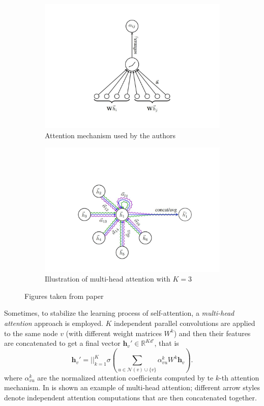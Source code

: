 \documentclass[12pt,a4paper]{report}
\theoremstyle{definition}
\begin{document}
\begin{figure}
\centering
\begin{subfigure}{.4\textwidth}
  \centering
  \includegraphics[trim={8cm 2.2cm 8cm 0}, clip,width=0.9\linewidth]{Images/GAT_article.pdf}
  \caption{Attention mechanism used by the authors}
  \label{fig:GAT_article}
\end{subfigure}
\begin{subfigure}{.58\textwidth}
  \centering
  \includegraphics[trim={5cm 2.2cm 4.5cm 0}, clip,width=0.9\linewidth]{Images/GAT_multi_head.pdf}
  \caption{Illustration of multi-head attention with $K = 3$}
  \label{fig:GAT_multihead}
\end{subfigure}
\caption{Figures taken from paper \cite{GATs}}
\label{fig:GATs}
\end{figure}

Sometimes, to stabilize the learning process of self-attention, a \emph{multi-head attention} approach is employed.
$K$ independent parallel convolutions are applied to the same node $v$ (with different weight matrices $W^k$) and then their features are concatenated to get a final vector $\textbf{h}_v ' \in \mathbb{R}^{Kd'}$, that is
\begin{equation*}
    \textbf{h}_v ' = ||_{k=1} ^K \sigma \left( \sum_{u \in \mathcal{N}(v) \cup \{v\}} \alpha _{vu} ^k W^k \textbf{h}_v \right) .
\end{equation*}
where $\alpha _{vu}^k$ are the normalized attention coefficients computed by te $k$-th attention mechanism.
In  is shown an example of multi-head attention; different arrow styles denote independent attention computations that are then concatenated together.
\end{document}
